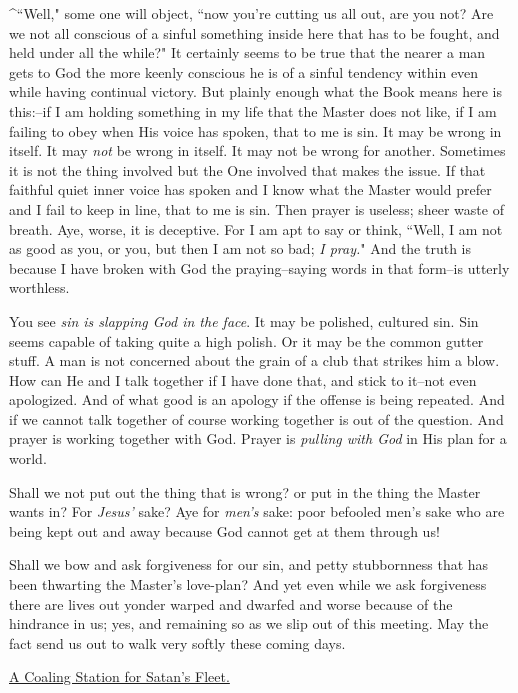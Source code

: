 ^``Well," some one will object, ``now you're cutting us all out, are you not?
Are we not all conscious of a sinful something inside here that has to be
fought, and held under all the while?" It certainly seems to be true that
the nearer a man gets to God the more keenly conscious he is of a sinful
tendency within even while having continual victory. But plainly enough
what the Book means here is this:--if I am holding something in my life
that the Master does not like, if I am failing to obey when His voice has
spoken, that to me is sin. It may be wrong in itself. It may \textit{not} be
wrong in itself. It may not be wrong for another. Sometimes it is not the
thing involved but the One involved that makes the issue. If that faithful
quiet inner voice has spoken and I know what the Master would prefer and I
fail to keep in line, that to me is sin. Then prayer is useless; sheer
waste of breath. Aye, worse, it is deceptive. For I am apt to say or
think, ``Well, I am not as good as you, or you, but then I am not so bad;
\textit{I pray.}" And the truth is because I have broken with God the
praying--saying words in that form--is utterly worthless.

You see \textit{sin is slapping God in the face}. It may be polished, cultured
sin. Sin seems capable of taking quite a high polish. Or it may be the
common gutter stuff. A man is not concerned about the grain of a club that
strikes him a blow. How can He and I talk together if I have done that,
and stick to it--not even apologized. And of what good is an apology if
the offense is being repeated. And if we cannot talk together of course
working together is out of the question. And prayer is working together
with God. Prayer is \textit{pulling with God} in His plan for a world.

Shall we not put out the thing that is wrong? or put in the thing the
Master wants in? For \textit{Jesus'} sake? Aye for \textit{men's} sake: poor befooled
men's sake who are being kept out and away because God cannot get at them
through us!

Shall we bow and ask forgiveness for our sin, and petty stubbornness that
has been thwarting the Master's love-plan? And yet even while we ask
forgiveness there are lives out yonder warped and dwarfed and worse
because of the hindrance in us; yes, and remaining so as we slip out of
this meeting. May the fact send us out to walk very softly these coming
days.



\underline{A Coaling Station for Satan's Fleet.}


